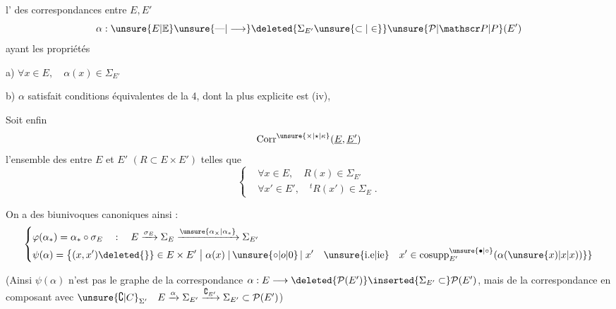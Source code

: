 l' des  correspondances entre $E,E'$
\[
 \alpha:\unsure{E|{\mathbb E}}\unsure{\mbox{---}|\longrightarrow}
 \deleted{\Sigma_{E'}\unsure{\subset|\in}}\unsure{\mathcal P|\mathscr P|P}(E')
\]
ayant les propriétés

a) $\forall x\in E,\quad\alpha(x)\in\Sigma_{E'}$

b) $\alpha$ satisfait  conditions équivalentes de la  4, dont la plus explicite est  (iv), 

Soit enfin
\[
 \operatorname{Corr}^{\unsure{\times|\star|\kappa}}(\underline E,\underline{E'})
\]
l'ensemble des  entre  $E$ et $E'$ $(R\subset E\times E')$ telles que
\[
 \left\{\begin{aligned}
 &\forall x\in E,\quad R(x)\in\Sigma_{E'}\\
 &\forall x'\in E',\quad {}^{t}R(x')\in\Sigma_E\;.
 \end{aligned}\right.
\]

On a  des  biunivoques canoniques
 ainsi :
\[
 \left\{\begin{aligned}
 &\varphi(\alpha_{*})=\alpha_{*}\circ\sigma_E
 \quad:\quad E\xrightarrow{\sigma_E}\Sigma_E\xrightarrow{\unsure{\alpha_{\times}|\alpha_{*}}}\Sigma_{E'}\\
 &\psi(\alpha)=\bigl\{(x,x')\deleted{\}}\in E\times E'\bigm|
 \alpha(x)\mathrel{|\,\unsure{\circ|o|0}\,|}x'\quad
 \text{\unsure{i.e|ie}}\quad x'\in\operatorname{cosupp}^{\unsure{\bullet|\circ}}_{E'}(\alpha(\unsure{x)|x|x))\}}
 \end{aligned}\right.
\]

(Ainsi $\psi(\alpha)$ n'est pas le graphe de la correspondance $\alpha:E\longrightarrow\deleted{\mathcal P(E')}\inserted{\Sigma_{E'}\subset}\mathcal P(E')$, mais de la correspondance  en composant avec $\unsure{\complement|C}_{\Sigma'}\quad E\xrightarrow{\alpha}\Sigma_{E'}\xrightarrow{\complement_{E'}}\Sigma_{E'}\subset\mathcal P(E')$)
